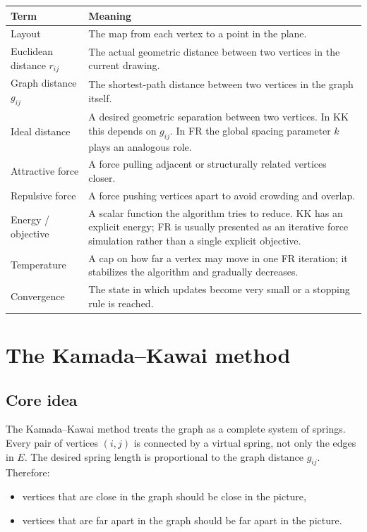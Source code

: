 \documentclass[11pt]{article}
\begin{document}
\begin{center}
\begin{tabular}{>{\raggedright\arraybackslash}p{} >{\raggedright\arraybackslash}p{}}
\toprule
\textbf{Term} & \textbf{Meaning} \\
\midrule
Layout & The map from each vertex to a point in the plane. \\
Euclidean distance $r_{ij}$ & The actual geometric distance between two vertices in the current drawing. \\
Graph distance $g_{ij}$ & The shortest-path distance between two vertices in the graph itself. \\
Ideal distance & A desired geometric separation between two vertices. In KK this depends on $g_{ij}$. In FR the global spacing parameter $k$ plays an analogous role. \\
Attractive force & A force pulling adjacent or structurally related vertices closer. \\
Repulsive force & A force pushing vertices apart to avoid crowding and overlap. \\
Energy / objective & A scalar function the algorithm tries to reduce. KK has an explicit energy; FR is usually presented as an iterative force simulation rather than a single explicit objective. \\
Temperature & A cap on how far a vertex may move in one FR iteration; it stabilizes the algorithm and gradually decreases. \\
Convergence & The state in which updates become very small or a stopping rule is reached. \\
\bottomrule
\end{tabular}
\end{center}

\section{The Kamada--Kawai method}

\subsection{Core idea}

The Kamada--Kawai method treats the graph as a complete system of springs.
Every pair of vertices $(i,j)$ is connected by a virtual spring, not only the
edges in $E$. The desired spring length is proportional to the graph distance
$g_{ij}$. Therefore:
\begin{itemize}[leftmargin=1.5em]
\item vertices that are close in the graph should be close in the picture,
\item vertices that are far apart in the graph should be far apart in the picture.
\end{itemize}
\end{document}
